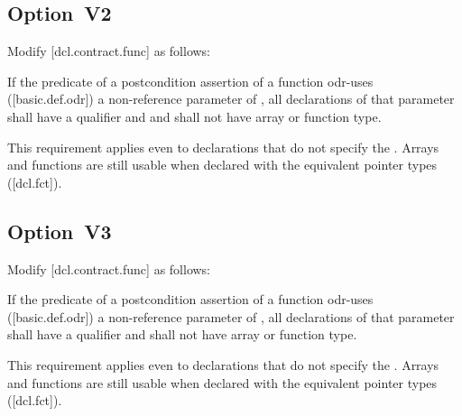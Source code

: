 \subsection*{Option~V2}

Modify [dcl.contract.func] as follows:

\begin{adjustwidth}{0.5cm}{0.5cm}
If the predicate of a postcondition assertion of a function odr-uses ([basic.def.odr]) a
non-reference parameter of , all declarations of that parameter shall have a  qualifier and and shall not have array or function type.
\begin{note}
This requirement applies even to declarations
that do not specify the . Arrays and functions are still usable when declared with the equivalent pointer types ([dcl.fct]).
\end{note}
\begin{example}
\tcode{[...]}
\end{example}
\end{adjustwidth}

\subsection*{Option~V3}

Modify [dcl.contract.func] as follows:

\begin{adjustwidth}{0.5cm}{0.5cm}
If the predicate of a postcondition assertion of a function odr-uses ([basic.def.odr]) a
non-reference parameter of , all declarations of
that parameter shall have a  qualifier and shall not have array or function type.
\begin{note}
This requirement applies even to declarations
that do not specify the . Arrays and functions are still usable when declared with the equivalent pointer types ([dcl.fct]).
\end{note}
\begin{example}
\tcode{[...]}
\end{example}
\end{adjustwidth}

